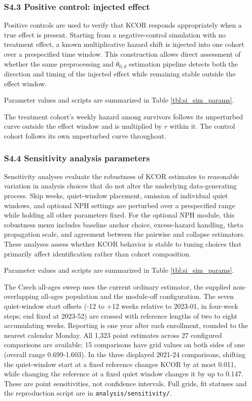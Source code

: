 \documentclass[
]{article}
\begin{document}
\subsubsection{S4.3 Positive control: injected effect}\label{s4.3-positive-control-injected-effect}

Positive controls are used to verify that KCOR responds appropriately when a true effect is present. Starting from a negative-control simulation with no treatment effect, a known multiplicative hazard shift is injected into one cohort over a prespecified time window. This construction allows direct assessment of whether the same preprocessing and \(\theta_{0,d}\) estimation pipeline detects both the direction and timing of the injected effect while remaining stable outside the effect window.

Parameter values and scripts are summarized in Table \ref{tbl:si_sim_params}.

The treatment cohort's weekly hazard among survivors follows its unperturbed curve outside the effect window and is multiplied by \(r\) within it. The control cohort follows its own unperturbed curve throughout.

\subsubsection{S4.4 Sensitivity analysis parameters}\label{s4.4-sensitivity-analysis-parameters}

Sensitivity analyses evaluate the robustness of KCOR estimates to reasonable variation in analysis choices that do not alter the underlying data-generating process. Skip weeks, quiet-window placement, omission of individual quiet windows, and optional NPH settings are perturbed over a prespecified range while holding all other parameters fixed. For the optional NPH module, this robustness menu includes baseline anchor choice, excess-hazard handling, theta propagation scale, and agreement between the pairwise and collapse estimators. These analyses assess whether KCOR behavior is stable to tuning choices that primarily affect identification rather than cohort composition.

Parameter values and scripts are summarized in Table \ref{tbl:si_sim_params}.

The Czech all-ages sweep uses the current ordinary estimator, the supplied non-overlapping all-ages population and the module-off configuration. The seven quiet-window start offsets (-12 to +12 weeks relative to 2023-01, in four-week steps; end fixed at 2023-52) are crossed with reference lengths of two to eight accumulating weeks. Reporting is one year after each enrollment, rounded to the nearest calendar Monday. All 1,323 point estimates across 27 configured comparisons are available; 15 comparisons have grid values on both sides of one (overall range 0.699-1.603). In the three displayed 2021-24 comparisons, shifting the quiet-window start at a fixed reference changes KCOR by at most 0.011, while changing the reference at a fixed quiet window changes it by up to 0.147. These are point sensitivities, not confidence intervals. Full grids, fit statuses and the reproduction script are in \texttt{analysis/sensitivity/}.
\end{document}
